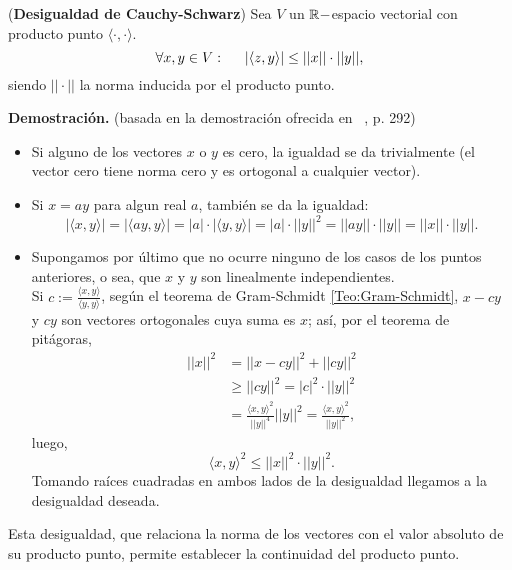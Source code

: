 \begin{teo}
(\textbf{Desigualdad de Cauchy-Schwarz}) \label{Teo:CauchySchwarz}
Sea $V$ un $\mathbb{R}-$espacio vectorial con producto punto 
$ \langle \cdot  , \cdot  \rangle$.
\begin{equation}
\label{eq0: 12Feb}
\forall x , y \in V : \hspace{0.5cm}
|\langle  z , y \rangle | \leq ||x|| \cdot ||y||,
\end{equation}
siendo $|| \cdot ||$
la norma inducida por el producto punto.
\end{teo}
\noindent
\textbf{Demostración.}
(basada en la demostración
ofrecida en ~\cite{Lang}, p. 292)
\begin{itemize}
\item Si alguno de los vectores $x$ o $y$ es cero,
la igualdad se da trivialmente (el vector cero tiene norma
cero y es ortogonal a cualquier vector). 

\item Si $x=a y$ para algun real $a$, también se 
da la igualdad:
\[
|\langle  x , y \rangle | =
|\langle  ay , y \rangle | = |a| \cdot  |\langle  y , y \rangle | =  
 |a| \cdot ||y||^{2}
=||ay|| \cdot ||y|| = ||x|| \cdot ||y||.
\]
\item Supongamos por último que no ocurre ninguno
de los casos de los puntos anteriores, o sea, que
$x$ y $y$ son linealmente independientes. \\
Si $c:=\frac{\langle x , y \rangle}{\langle y , y \rangle}$,
según el teorema de Gram-Schmidt \ref{Teo:Gram-Schmidt}, 
$x-cy$ y $cy$ son vectores ortogonales cuya suma es $x$;
así, por el teorema de pitágoras,
\begin{align*}
||x||^{2} & = ||x-cy||^{2} + ||cy||^{2} \\
& \geq ||cy||^{2}= |c|^{2} \cdot ||y||^{2} \\
& = \frac{\langle x , y \rangle ^{2}}{||y||^{4}}||y||^{2}
= \frac{\langle x , y \rangle ^{2}}{||y||^{2}},
\end{align*}
luego, 
\[
\langle x, y \rangle ^{2}  \leq ||x||^{2} \cdot ||y||^{2}.
\]
Tomando raíces cuadradas en ambos lados de la
desigualdad llegamos a la desigualdad deseada. \QEDB
\end{itemize}
\vspace{0.2cm}


Esta desigualdad, que relaciona la norma de los
vectores con el valor
absoluto de su producto punto, permite
establecer la continuidad del producto punto. \\


